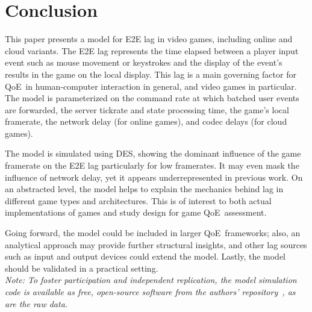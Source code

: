 \section{Conclusion}
\label{sec:conclusion}


This paper presents a model for \acrfull{E2E} lag in video games, including online and cloud variants. The \gls{E2E} lag represents the time elapsed between a player input event such as mouse movement or keystrokes and the display of the event's results in the game on the local display. This lag is a main governing factor for \acrfull{QoE} in human-computer interaction in general, and video games in particular. The model is parameterized on the command rate at which batched user events are forwarded, the server tickrate and state processing time, the game's local framerate, the network delay (for online games), and codec delays (for cloud games). %

The model is simulated using \acrfull{DES}, showing the dominant influence of the game framerate on the \gls{E2E} lag particularly for low framerates. It may even mask the influence of network delay, yet it appears underrepresented in previous work.  On an abstracted level, the model helps to explain the mechanics behind lag in different game types and architectures. This is of interest to both actual implementations of games and study design for game \gls{QoE} assessment.

Going forward, the model could be included in larger \gls{QoE} frameworks; also, an analytical approach may provide further structural insights, and other lag sources such as input and output devices could extend the model. Lastly, the model should be validated in a practical setting.\\

\textit{Note: To foster participation and independent replication, the model simulation code is available as free, open-source software from the authors' repository~\cite{onlinegame-lag-sim-repo}, as are the raw data.}
